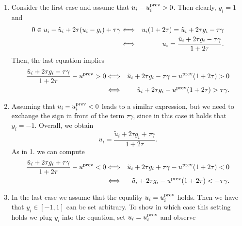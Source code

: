         \begin{enumerate}
            \item Consider the first case and assume that $u_{i} - u^{\textnormal{prev}}_{i} > 0$. Then clearly, $y_{i} = 1$ and
                \begin{eqnarray}
                    0 \in u_{i} - \tilde{u}_{i} + 2\tau (u_{i} - g_{i}) + \tau\gamma &\Longleftrightarrow& u_{i} (1 + 2\tau) = \tilde{u}_{i} + 2\tau g_{i} - \tau\gamma \notag \\
                    &\Longleftrightarrow& u_{i} = \frac{\tilde{u}_{i} + 2\tau g_{i} - \tau\gamma}{1 + 2\tau}. \notag
                \end{eqnarray}
            Then, the last equation implies
                \begin{eqnarray}
                    \frac{\tilde{u}_{i} + 2\tau g_{i} - \tau\gamma}{1 + 2\tau} - u^{\textnormal{prev}} > 0 &\Longleftrightarrow& \tilde{u}_{i} + 2\tau g_{i} - \tau\gamma - u^{\textnormal{prev}} (1 + 2\tau) > 0 \notag \\
                    &\Longleftrightarrow& \tilde{u}_{i} + 2\tau g_{i} - u^{\textnormal{prev}} (1 + 2\tau) > \tau\gamma.
                \end{eqnarray}
            \item Assuming that $u_{i} - u^{\textnormal{prev}}_{i} < 0$ leads to a similar expression, but we need to exchange the sign in front of the term $\tau\gamma$, since in this case it holds that $y_{i} = -1$. Overall, we obtain
                $$
                    u_{i} = \frac{\tilde{u}_{i} + 2\tau g_{i} + \tau\gamma}{1 + 2\tau}.
                $$
            As in 1. we can compute
                \begin{eqnarray}
                    \frac{\tilde{u}_{i} + 2\tau g_{i} + \tau\gamma}{1 + 2\tau} - u^{\textnormal{prev}} < 0 &\Longleftrightarrow& \tilde{u}_{i} + 2\tau g_{i} + \tau\gamma - u^{\textnormal{prev}} (1 + 2\tau) < 0 \notag \\
                    &\Longleftrightarrow& \tilde{u}_{i} + 2\tau g_{i} - u^{\textnormal{prev}} (1 + 2\tau) < -\tau\gamma.
                \end{eqnarray}
            \item In the last case we assume that the equality $u_{i} = u^{\textnormal{prev}}_{i}$ holds. Then we have that $y_{i} \in [-1, 1]$ can be set arbitrary. To show in which case this setting holds we plug $y_{i}$ into the equation, set $u_{i} = u^{\textnormal{prev}}_{i}$ and observe
                \begin{eqnarray}

\end{eqnarray}
\end{enumerate}
